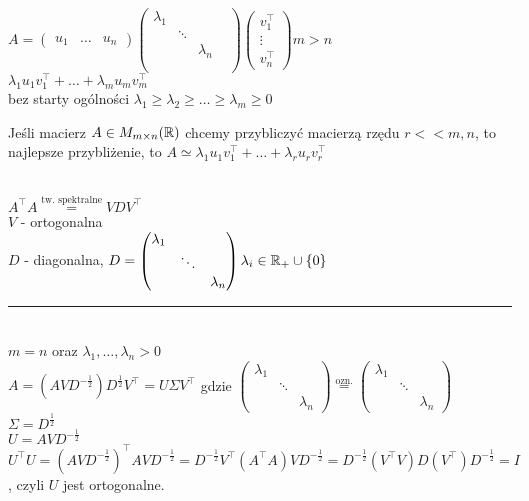$A = \begin{pmatrix} u_1 & \ldots & u_n \end{pmatrix} 
\begin{pmatrix} \lambda_1 & & \\ & \ddots & \\ & & \lambda_n \\ & & & \\ & & & \end{pmatrix} 
\begin{pmatrix} v_1^\top \\ \vdots \\ v_n^\top \end{pmatrix} m > n$ \\ 
$ \lambda_1 u_1 v_1^\top + \ldots + \lambda_m u_m v_m^\top$ \\ 
bez starty ogólności $\lambda_1 \ge \lambda_2 \ge \ldots \ge \lambda_m \ge 0$
\begin{uw} 
    Jeśli macierz $A \in M_{m \times n}(\mathbb{R})$ chcemy przybliczyć macierzą rzędu $r << m, n$, to 
    najlepsze przybliżenie, to $A \simeq \lambda_1 u_1 v_1^\top + \ldots + \lambda_r u_r v_r^\top$
\end{uw} 
\begin{dd} ~\\
    $A^\top A \overset{\text{tw. spektralne}}{=} VDV^\top$ \\ 
    $V$ - ortogonalna \\ 
    $D$ - diagonalna, $D = \begin{pmatrix} \lambda_1 & & \\ & \ddots & \\ & & \lambda_n \end{pmatrix} 
    \lambda_i \in \mathbb{R}_+ \cup \{0\}$ \\ 
    \rule{2cm}{0.4pt} \\ 
    $m = n$ oraz $\lambda_1,\ldots,\lambda_n > 0$ \\ 
    $A = (AVD^{-\frac{1}{2}})D^{\frac{1}{2}}V^\top = U\Sigma V^\top$ 
    gdzie $\begin{pmatrix} \lambda_1 & & \\ & \ddots & \\ & & \lambda_n \end{pmatrix}
    \overset{\text{ozn.}}{=} \begin{pmatrix} \lambda_1 & & \\ & \ddots & \\ & & \lambda_n \end{pmatrix}$\\
    $\Sigma = D^{\frac{1}{2}}$ \\ 
    $U = AVD^{-\frac{1}{2}}$ \\ 
    $U^\top U = (AVD^{-\frac{1}{2}})^\top AVD^{-\frac{1}{2}} = D^{-\frac{1}{2}}V^\top (A^\top A)V
    D^{-\frac{1}{2}} = D^{-\frac{1}{2}}(V^\top V)D(V^\top)D^{-\frac{1}{2}} = I$, czyli $U$ jest 
    ortogonalne.
\end{dd} 
